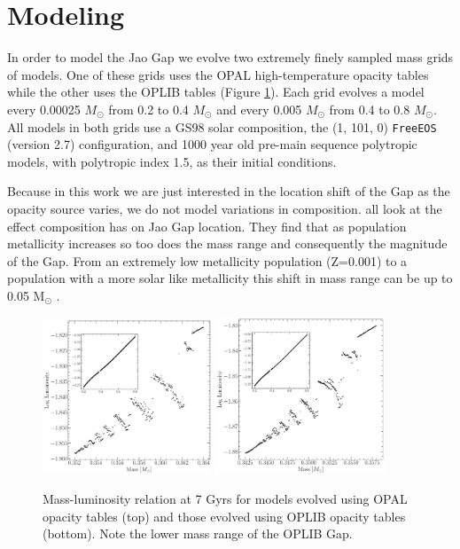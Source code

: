 \section{Modeling}\label{sec:modeling}
In order to model the Jao Gap we evolve two extremely finely sampled mass grids
of models. One of these grids uses the OPAL high-temperature opacity tables
while the other uses the OPLIB tables (Figure \ref{fig:PunchIn}). Each grid
evolves a model every 0.00025 $M_{\odot}$ from 0.2 to 0.4 $M_{\odot}$ and every
0.005 $M_{\odot}$ from 0.4 to 0.8 $M_{\odot}$. All models in both grids use a
GS98 solar composition, the (1, 101, 0) \texttt{FreeEOS} (version
{\color{red}2.7}) configuration, and 1000 year old pre-main sequence polytropic
models, with polytropic index 1.5, as their initial conditions.

Because in this work we are just interested in the location shift of the Gap as
the opacity source varies, we do not model variations in composition.
\citet{Mansfield2021,Jao2020,Feiden2021} all look at the effect composition has
on Jao Gap location. They find that as population metallicity increases so too
does the mass range and consequently the magnitude of the Gap. From an extremely
low metallicity population (Z=0.001) to a population with a more solar like
metallicity this shift in mass range can be up to 0.05 M$_{\odot}$
\citep{Mansfield2021}.

\begin{figure}
	\centering
	\includegraphics[width=0.45\textwidth]{OPALPunchIn.pdf}
	\includegraphics[width=0.45\textwidth]{OPLIBPunchIn.pdf}
	\caption{Mass-luminosity relation at 7 Gyrs for models evolved using OPAL opacity
	tables (top) and those evolved using OPLIB opacity tables (bottom). Note
	the lower mass range of the OPLIB Gap.}
	\label{fig:PunchIn}
		
\end{figure}

